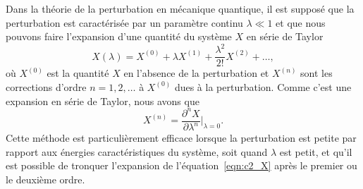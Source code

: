 Dans la théorie de la perturbation en mécanique quantique, il est supposé que la perturbation est caractérisée par un paramètre continu $\lambda\ll1$ et que nous pouvons faire l'expansion d'une quantité du système $X$ en série de Taylor
\begin{equation}
    X(\lambda)=X^{(0)}+\lambda X^{(1)}+\frac{\lambda^2}{2!}X^{(2)}+\dots,\label{eqn:c2_X}
\end{equation}
où $X^{(0)}$ est la quantité $X$ en l'absence de la perturbation  et $X^{(n)}$ sont les corrections d'ordre $n=1,2,\dots$ à $X^{(0)}$ dues à la perturbation. Comme c'est une expansion en série de Taylor, nous avons que
\begin{equation}
    X^{(n)}=\frac{\partial^n X}{\partial\lambda^n}\bigg\rvert_{\lambda=0}.\label{eqn:c2_Xn}
\end{equation}
Cette méthode est particulièrement efficace lorsque la perturbation est petite par rapport aux énergies caractéristiques du système, soit quand $\lambda$ est petit, et qu'il est possible de tronquer l'expansion de l'équation~\eqref{eqn:c2_X} après le premier ou le deuxième ordre.

